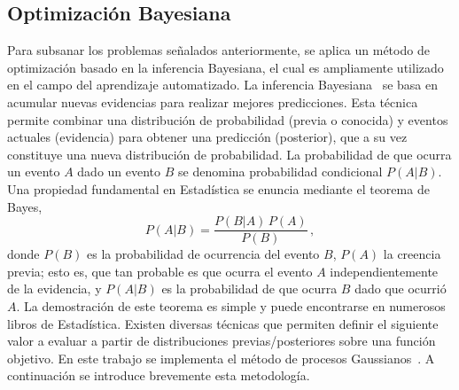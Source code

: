 \subsection{Optimización Bayesiana}
\label{sec:gaussianprocess}


Para subsanar los problemas señalados anteriormente, se aplica un método 
de optimización basado en la inferencia Bayesiana, el cual es 
ampliamente utilizado en el campo del aprendizaje automatizado. 
La inferencia Bayesiana~\cite{Gelman:13,Barber:12} se basa en acumular 
nuevas evidencias para realizar mejores predicciones. Esta técnica 
permite combinar una distribución 
de probabilidad (previa o conocida) y eventos actuales (evidencia) para 
obtener una predicción (posterior), que a su vez constituye una nueva 
distribución de probabilidad. La probabilidad de que ocurra un evento 
$A$ dado un evento $B$ se denomina probabilidad condicional $P(A|B)$. 
Una propiedad fundamental en Estadística se enuncia mediante el teorema 
de Bayes,
\begin{equation}
P(A|B)=\frac{P(B|A)\,P(A)}{P(B)}\,,
\end{equation}
donde $P(B)$ es la probabilidad de ocurrencia del evento $B$, $P(A)$ la
creencia previa; esto es, que tan probable es que ocurra el evento $A$
independientemente de la evidencia, y $P(A|B)$ es la probabilidad de que
ocurra $B$ dado que ocurrió $A$. La demostración de este teorema es 
simple y puede encontrarse en numerosos libros de Estadística. 
Existen diversas técnicas que permiten definir el siguiente valor a 
evaluar a partir de distribuciones previas/posteriores sobre una función 
objetivo. En este trabajo se implementa el método de procesos 
Gaussianos~\cite{Bergstra:11}. A continuación se introduce brevemente
esta metodología.

